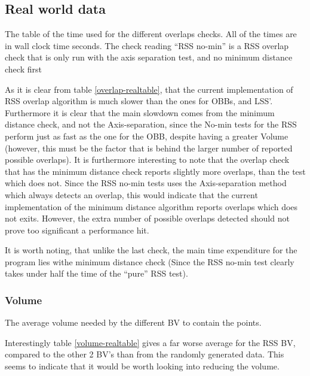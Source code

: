 \subsection{Real world data}

\begin{table}

\caption{\label{overlap-realtable}The table of the time used for the
  different overlaps checks. All of the times are in wall clock time seconds. The
  check reading ``RSS no-min'' is a RSS overlap check that is only run
with the axis separation test, and no minimum distance check first}
\end{table}

As it is clear from table \ref{overlap-realtable}, that the current implementation of RSS overlap algorithm is much slower than the ones for  OBBs, and  LSS'. Furthermore it is clear that the main slowdown comes from the minimum distance check, and not the Axis-separation, since the No-min tests for the RSS perform just as fast as the one for the OBB, despite having a greater Volume (however, this must be the factor that is behind the larger number of reported possible overlaps). It is furthermore interesting to note that the overlap check that has the minimum distance check reports slightly more overlaps, than the test which does not. Since the RSS no-min tests uses the Axis-separation method which always detects an overlap, this would indicate that the current implementation of the minimum distance algorithm reports overlaps which does not exits. However, the extra number of possible overlaps detected should not prove too significant a performance hit.

It is worth noting, that unlike the last check, the main time expenditure for the program lies withe minimum distance check (Since the RSS no-min test clearly takes under half the time of the ``pure'' RSS test).

\subsubsection{Volume}
\begin{table}

\caption{\label{volume-realtable} The average volume needed by the
  different BV to contain the points.}
\end{table}

Interestingly table \ref{volume-realtable} gives a far worse average for the RSS BV, compared to the other 2 BV's than from the randomly generated data. This seems to indicate that it would be worth looking into reducing the volume.


